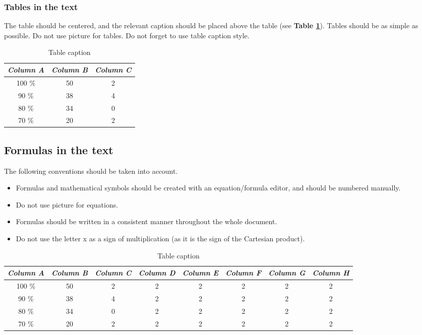 \documentclass[10pt,a4paper,twocolumns]{article}
\begin{document}
\subsubsection{Tables in the text}

The table should be centered, and the relevant caption should be placed above the table (see \textbf{Table \ref{tab:table1label}}). Tables should be as simple as possible. Do not use picture for tables. Do not forget to use table caption style.


\begin{table}[htbp]
\centering \caption{Table caption}\label{tab:table1label}
\begin{tabular}{c c c} \hline
 \textbf{\emph{Column A}} &\textbf{\emph{Column B}} & \textbf{\emph{Column C}} \\ \hline
  100 \%  	&	50 		&	2 \\
  90 \%  	&	38 		&	4 \\
  80 \%  	&	34 		&	0 \\
  70 \%  	&	20 		&	2 \\ \hline
\end{tabular}
\end{table}

\subsection{Formulas in the text}

The following conventions should be taken into account.

\begin{itemize}
    \item Formulas and mathematical symbols should be created with an equation/formula editor, and should be numbered manually.
    \item Do not use picture for equations.
    \item Formulas should be written in a consistent manner throughout the whole document.
    \item Do not use the letter x as a sign of multiplication (as it is the sign of the Cartesian product).
\end{itemize}

\begin{table}[b]
\centering \caption{Table caption}\label{tab:table2label}
\begin{tabular}{c c c c c c c c} \hline
 \textbf{\emph{Column A}} &\textbf{\emph{Column B}} & \textbf{\emph{Column C}} & \textbf{\emph{Column D}} & \textbf{\emph{Column E}} & \textbf{\emph{Column F}} & \textbf{\emph{Column G}} & \textbf{\emph{Column H}} \\ \hline
  100 \%  	&	50 		&	2 &	2 &	2 &	2 &	2 &	2 \\
  90 \%  	&	38 		&	4 &	2 &	2 &	2 &	2 &	2 \\
  80 \%  	&	34 		&	0 &	2 &	2 &	2 &	2 &	2 \\
  70 \%  	&	20 		&	2 &	2 &	2 &	2 &	2 &	2 \\ \hline
\end{tabular}
\end{table}
\end{document}
